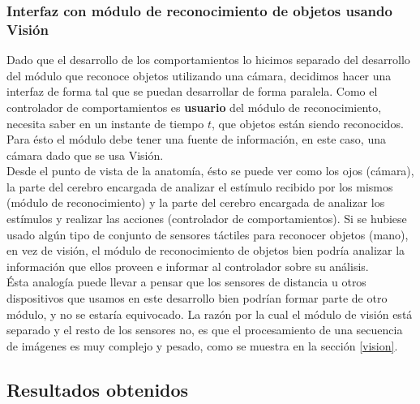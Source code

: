 \subsubsection{Interfaz con m\'odulo de reconocimiento de objetos usando Visi\'on}
Dado que el desarrollo de los comportamientos lo hicimos separado del desarrollo del
m\'odulo que reconoce objetos utilizando una c\'amara, decidimos hacer una interfaz de
forma tal que se puedan desarrollar de forma paralela.
Como el controlador de comportamientos es \textbf{usuario} del m\'odulo de reconocimiento,
necesita saber en un instante de tiempo $t$, que objetos est\'an siendo reconocidos. Para \'esto
el m\'odulo debe tener una fuente de informaci\'on, en este caso, una c\'amara dado que se usa
Visi\'on.
\\
Desde el punto de vista de la anatom\'ia, \'esto se puede ver como los ojos (c\'amara), la parte del cerebro
encargada de analizar el est\'imulo recibido por los mismos (m\'odulo de reconocimiento) y la parte del cerebro
encargada de analizar los est\'imulos y realizar las acciones (controlador de comportamientos). Si se hubiese
usado alg\'un tipo de conjunto de sensores t\'actiles para reconocer objetos (mano), en vez de visi\'on, 
el m\'odulo de reconocimiento de objetos bien podr\'ia analizar la informaci\'on que ellos proveen e
informar al controlador sobre su an\'alisis.
\\
\'Esta analog\'ia puede llevar a pensar que los sensores de distancia u otros dispositivos que usamos
en este desarrollo bien podr\'ian formar parte de otro m\'odulo, y no se estar\'ia equivocado. La raz\'on
por la cual el m\'odulo de visi\'on est\'a separado y el resto de los sensores no, es que el procesamiento
de una secuencia de im\'agenes es muy complejo y pesado, como se muestra en la secci\'on \ref{vision}.

\newpage
\subsection{Resultados obtenidos}
\label{results}

